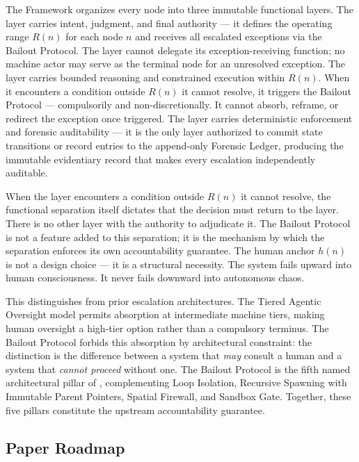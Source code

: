 The \bxthree Framework organizes every node into three immutable functional layers. The \textbf{\purpose} layer carries intent, judgment, and final authority — it defines the operating range $R(n)$ for each node $n$ and receives all escalated exceptions via the Bailout Protocol. The \purpose layer cannot delegate its exception-receiving function; no machine actor may serve as the terminal node for an unresolved exception. The \textbf{\bounds} layer carries bounded reasoning and constrained execution within $R(n)$. When it encounters a condition outside $R(n)$ it cannot resolve, it triggers the Bailout Protocol — compulsorily and non-discretionally. It cannot absorb, reframe, or redirect the exception once triggered. The \textbf{\fact} layer carries deterministic enforcement and forensic auditability — it is the only layer authorized to commit state transitions or record entries to the append-only Forensic Ledger, producing the immutable evidentiary record that makes every escalation independently auditable.

When the \bounds layer encounters a condition outside $R(n)$ it cannot resolve, the functional separation itself dictates that the decision must return to the \purpose layer. There is no other layer with the authority to adjudicate it. The Bailout Protocol is not a feature added to this separation; it is the mechanism by which the separation enforces its own accountability guarantee. The human anchor $h(n)$ is not a design choice — it is a structural necessity. The \bxthree system fails upward into human consciousness. It never fails downward into autonomous chaos.

This distinguishes \bxthree from prior escalation architectures. The Tiered Agentic Oversight model \cite{kim2025tao} permits absorption at intermediate machine tiers, making human oversight a high-tier option rather than a compulsory terminus. The Bailout Protocol forbids this absorption by architectural constraint: the distinction is the difference between a system that \emph{may} consult a human and a system that \emph{cannot proceed} without one. The Bailout Protocol is the fifth named architectural pillar of \bxthree, complementing Loop Isolation, Recursive Spawning with Immutable Parent Pointers, Spatial Firewall, and Sandbox Gate. Together, these five pillars constitute the upstream accountability guarantee.

\subsection{Paper Roadmap}
\label{sec:roadmap}

